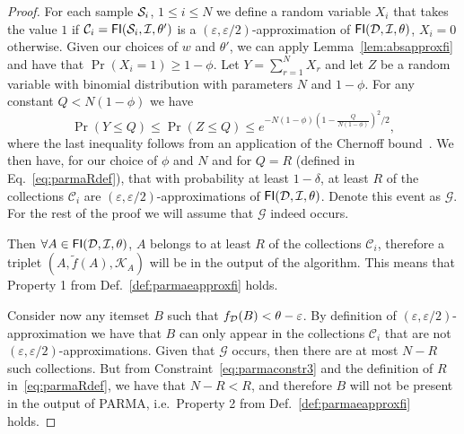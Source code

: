 \begin{proof}
  For each sample ${\cal S}_i$, $1\le i\le N$ we define a random variable $X_i$ that
  takes the value $1$ if $\mathcal{C}_i=\mathsf{FI}({\cal S}_i,{\cal I},\theta')$ is a
  $(\varepsilon,\varepsilon/2)$-approximation of $\mathsf{FI}({\cal D},{\cal I},\theta)$, $X_i=0$
  otherwise. Given our choices of $w$ and $\theta'$, we can apply
  Lemma~\ref{lem:absapproxfi} and have that $\Pr(X_i=1)\ge 1-\phi$. Let
  $Y=\sum_{r=1}^N X_r$ and let $Z$ be a random variable with binomial
  distribution with parameters $N$ and $1-\phi$. For any constant $Q<N(1-\phi)$ we have
  \[
  \Pr(Y\le Q)\le\Pr(Z\le Q)\le e^{-N(1-\phi)(1-\frac{Q}{N(1-\phi)})^2/2},
  \]
  where the last inequality follows from an application of the Chernoff
  bound~\cite[Chap.~4]{MitzenmacherU05}.
  We then have, for our choice of $\phi$ and $N$ and for $Q=R$
  (defined in Eq.~\eqref{eq:parmaRdef}), that with probability at least $1-\delta$,
  at least $R$ of the collections $\mathcal{C}_i$ are
  $(\varepsilon,\varepsilon/2)$-approximations of $\mathsf{FI}({\cal D},{\cal I},\theta)$. Denote
  this event as $\mathcal{G}$. For the rest of the proof we will assume that
  $\mathcal{G}$ indeed occurs.

  Then $\forall A\in\mathsf{FI}({\cal D},{\cal I},\theta)$, $A$ belongs to at least $R$ of the
  collections $\mathcal{C}_i$, therefore a triplet
  $(A,\tilde{f}(A),\mathcal{K}_A)$ will be in the output of the algorithm. This
  means that Property 1 from Def.~\ref{def:parmaeapproxfi} holds. 

  Consider now any itemset $B$ such that $f_{\cal D}(B)<\theta-\varepsilon$. By
  definition of $(\varepsilon,\varepsilon/2)$-approximation we have that $B$ can
  only appear in the collections $\mathcal{C}_i$ that are not
  $(\varepsilon,\varepsilon/2)$-approximations. Given
  that $\mathcal{G}$ occurs, then there are at most  $N-R$ such collections. But
  from Constraint~\eqref{eq:parmaconstr3} and the definition of $R$
  in~\eqref{eq:parmaRdef}, we have that $N-R< R$, and therefore $B$ will not be
  present in the output of PARMA, i.e.~Property 2 from Def.~\ref{def:parmaeapproxfi} holds.


\end{proof}
